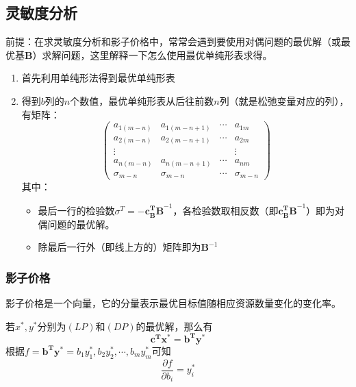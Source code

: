 \documentclass{book}
\begin{document}



\subsection{灵敏度分析}

前提：在求灵敏度分析和影子价格中，常常会遇到要使用对偶问题的最优解（或最优基$\boldsymbol{B}$）求解问题，这里解释一下怎么使用最优单纯形表求得。

\begin{enumerate}
    \item 首先利用单纯形法得到最优单纯形表
    \item 得到$b$列的$n$个数值，最优单纯形表从后往前数$n$列（就是松弛变量对应的列），有矩阵：$$\begin{pmatrix}
        a_{1(m-n)} & a_{1(m-n+1)} & \cdots & a_{1m}\\
        a_{2(m-n)} & a_{2(m-n+1)} & \cdots & a_{2m}\\
        \vdots &&& \vdots\\
        a_{n(m-n)} & a_{n(m-n+1)} & \cdots & a_{nm}\\
        \hline
        \sigma_{m-n} & \sigma_{m-n} & \cdots & \sigma_{m-n}
    \end{pmatrix}$$
    其中：
    \begin{itemize}
        \item 最后一行的检验数$\sigma^T =- \boldsymbol{c_B^TB}^{-1}$，各检验数取相反数（即$\boldsymbol{c_B^TB}^{-1}$）即为对偶问题的最优解。
        \item 除最后一行外（即线上方的）矩阵即为$\boldsymbol{B}^{-1}$
    \end{itemize}
\end{enumerate}

\subsubsection{影子价格}

影子价格是一个向量，它的分量表示最优目标值随相应资源数量变化的变化率。

若$x^*, y^*$分别为$(LP)$和$(DP)$的最优解，那么有$$\boldsymbol{c^Tx^*}=\boldsymbol{b^Ty^*}$$根据$f=\boldsymbol{b^Ty^*}=b_1y^*_1, b_2y^*_2, \cdots, b_my^*_m$可知$$\frac{\partial f}{\partial b_i} = y_i^*$$
\end{document}
